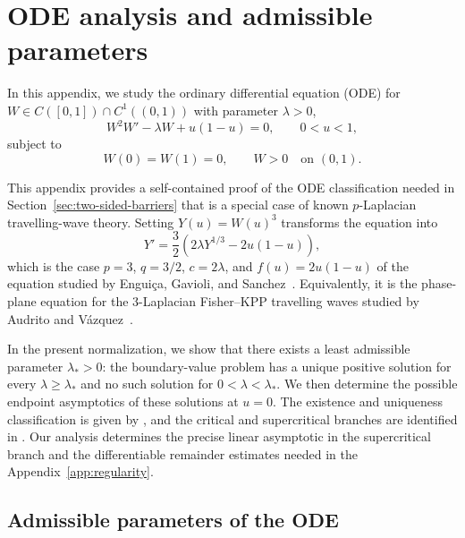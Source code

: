 \documentclass[12pt]{amsart}
\numberwithin{equation}{section}
\theoremstyle{plain}
\theoremstyle{definition}
\begin{document}
\appendix
\section{ODE analysis and admissible parameters}
\label{app:ode}
In this appendix, we study the ordinary differential equation (ODE) for \(W\in C([0,1])\cap C^1((0,1))\) with parameter \(\lambda > 0\),
\begin{equation}
 W^2W'-\lambda W+u(1-u)=0,
 \qquad 0<u<1,
 \label{eq:W-ode}
\end{equation}
subject to
\begin{equation}
 W(0)=W(1)=0,
 \qquad W>0\quad\text{on }(0,1).
 \label{eq:W-boundary}
\end{equation}

This appendix provides a self-contained proof of the ODE classification needed in Section~\ref{sec:two-sided-barriers} that is a special case of known $p$-Laplacian travelling-wave theory. Setting $Y(u)=W(u)^3$ transforms the equation into
\[
Y'=\frac32(2\lambda Y^{1/3}-2u(1-u)),
\]
which is the case $p=3$, $q=3/2$, $c=2\lambda$, and $f(u)=2u(1-u)$
of the equation studied by Engui\c{c}a, Gavioli, and
Sanchez~\cite[Proposition~2 and Theorem~3.3]{EnguicaGavioliSanchez2013}. Equivalently, it is the phase-plane equation for the $3$-Laplacian Fisher--KPP travelling waves studied by Audrito and Vázquez~\cite[Theorem~2.1 and Section~3]{AudritoVazquez2017}.

In the present normalization, we show that there exists a least admissible parameter $\lambda_*>0$: the
boundary-value problem has a unique positive solution for every
$\lambda\ge\lambda_*$ and no such solution for $0<\lambda<\lambda_*$.  We
then determine the possible endpoint asymptotics of these solutions at
$u=0$. The existence and uniqueness classification is given by
\cite[Proposition~2]{EnguicaGavioliSanchez2013}, and the critical and
supercritical branches are identified in
\cite[Theorem~3.3]{EnguicaGavioliSanchez2013}. Our analysis determines the
precise linear asymptotic in the supercritical branch and the differentiable
remainder estimates needed in the Appendix~\ref{app:regularity}.

\subsection{Admissible parameters of the ODE}
\end{document}
